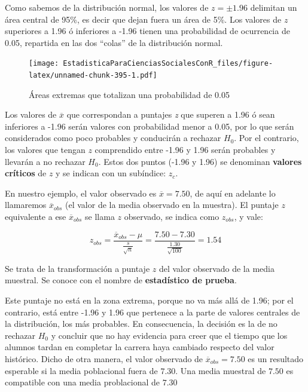 \documentclass[]{book}
\begin{document}
Como sabemos de la distribución normal, los valores de \(z = \pm 1.96\) delimitan un área central de 95\%, es decir que dejan fuera un área de 5\%. Los valores de \(z\) superiores a 1.96 ó inferiores a -1.96 tienen una probabilidad de ocurrencia de 0.05, repartida en las dos ``colas'' de la distribución normal.

\begin{figure}
\centering
\texttt{[image: EstadisticaParaCienciasSocialesConR\_files/figure-latex/unnamed-chunk-395-1.pdf]}
\caption{\label{fig:unnamed-chunk-395}Áreas extremas que totalizan una probabilidad de 0.05}
\end{figure}

Los valores de \(\overline{x}\) que correspondan a puntajes \emph{z} que
superen a 1.96 ó sean inferiores a -1.96 serán valores con probabilidad
menor a 0.05, por lo que serán considerados como poco probables y
conducirán a rechazar \(H_{0}\). Por el contrario, los valores que tengan \(z\) comprendido entre -1.96 y 1.96 serán probables y llevarán a no rechazar \(H_{0}\). Estos dos puntos (-1.96 y 1.96) se denominan \textbf{valores críticos} de \(z\) y se indican con un subíndice: \(z_{c}\).

En nuestro ejemplo, el valor observado es \(\overline{x} = 7.50\), de aquí en adelante lo llamaremos \({\overline{x}}_{obs}\) (el valor de la
media observado en la muestra). El puntaje \(z\) equivalente a ese
\({\overline{x}}_{obs}\) se llama \(z\) observado, se indica como \(z_{obs}\), y vale:

\[z_{obs} = \frac{{\overline{x}}_{obs} - \mu}{\frac{s}{\sqrt{n}}} = \frac{7.50 - 7.30}{\frac{1.30}{\sqrt{100}}} = 1.54\]

Se trata de la transformación a puntaje \(z\) del valor observado de la
media muestral. Se conoce con el nombre de \textbf{estadístico de prueba}.

Este puntaje no está en la zona extrema, porque no va más allá de 1.96;
por el contrario, está entre -1.96 y 1.96 que pertenece a la parte de
valores centrales de la distribución, los más probables. En
consecuencia, la decisión es la de no rechazar \(H_{0}\) y concluir que no hay evidencia para creer que el tiempo que los alumnos tardan en completar la carrera haya cambiado respecto del valor histórico. Dicho de otra manera, el valor observado de
\({\overline{x}}_{obs} = 7.50\) es un resultado esperable si la
media poblacional fuera de \(7.30\). Una media muestral de \(7.50\) es compatible con una media problacional de \(7.30\)
\end{document}
